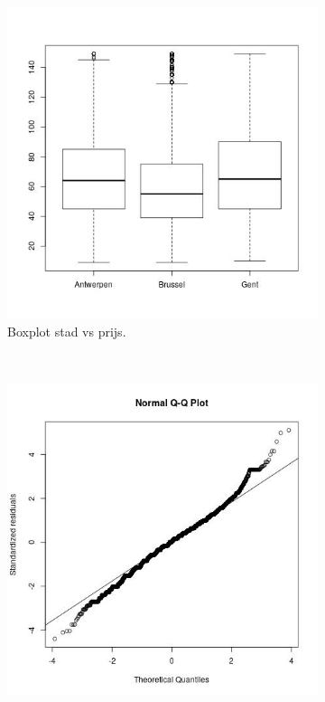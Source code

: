 \documentclass[a4paper,kulak]{kulakarticle} %
\begin{document}
\begin{figure}[H]
	\centering
	\begin{subfigure}[b]{0.3\textwidth}
		\includegraphics[width=\textwidth]{boxprijscity.jpg}
		\caption{Boxplot stad vs prijs.}
		\label{fig:bpcit}
	\end{subfigure}
	~ %
	\begin{subfigure}[b]{0.3\textwidth}
		\includegraphics[width=\textwidth]{qqboxcit.jpg}

\end{subfigure}
\end{figure}
\end{document}
